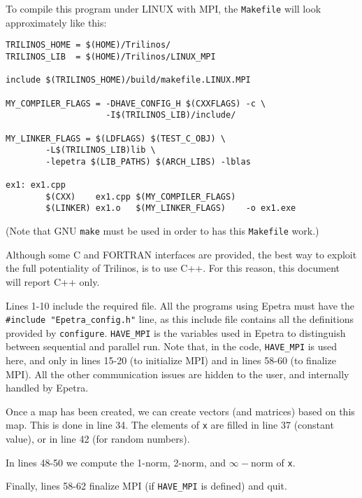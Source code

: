 To compile this program under LINUX with MPI, the \verb!Makefile! will
look approximately like this:
\begin{verbatim}
TRILINOS_HOME = $(HOME)/Trilinos/
TRILINOS_LIB  = $(HOME)/Trilinos/LINUX_MPI

include $(TRILINOS_HOME)/build/makefile.LINUX.MPI

MY_COMPILER_FLAGS = -DHAVE_CONFIG_H $(CXXFLAGS) -c \
                    -I$(TRILINOS_LIB)/include/
                    
MY_LINKER_FLAGS = $(LDFLAGS) $(TEST_C_OBJ) \
        -L$(TRILINOS_LIB)lib \
        -lepetra $(LIB_PATHS) $(ARCH_LIBS) -lblas

ex1: ex1.cpp
        $(CXX)    ex1.cpp $(MY_COMPILER_FLAGS) 
        $(LINKER) ex1.o   $(MY_LINKER_FLAGS)    -o ex1.exe
\end{verbatim}

(Note that GNU \verb!make! must be used in order to has this
\verb!Makefile! work.)

\begin{remark}
  Although some C and FORTRAN interfaces are provided, the best way to
  exploit the full potentiality of Trilinos, is to use C++. For this
  reason, this document will report C++ only.
\end{remark}

Lines 1-10 include the required file. All the programs using Epetra must
have the \verb!#include "Epetra_config.h"! line, as this include file
contains all the definitions provided by {\tt configure}. \verb!HAVE_MPI!
is the variables used in Epetra to distinguish between sequential and
parallel run. Note that, in the code, \verb!HAVE_MPI! is used here, and
only in lines 15-20 (to initialize MPI) and in lines 58-60 (to finalize
MPI). All the other communication issues are hidden to the user, and
internally handled by Epetra. 

Once a map has been created, we can create vectors (and matrices) based
on this map. This is done in line 34. The elements of {\tt x} are filled
in line 37 (constant value), or in line 42 (for random numbers).

In lines 48-50 we compute the 1-norm, 2-norm, and $\infty-$norm
of {\tt x}.

Finally, lines 58-62 finalize MPI (if \verb!HAVE_MPI! is defined) and
quit.

